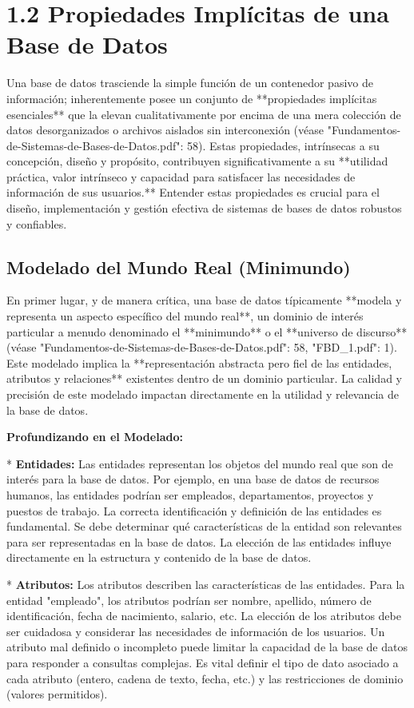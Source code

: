 \section{1.2 Propiedades Implícitas de una Base de Datos}

Una base de datos trasciende la simple función de un contenedor pasivo de información; inherentemente posee un conjunto de **propiedades implícitas esenciales** que la elevan cualitativamente por encima de una mera colección de datos desorganizados o archivos aislados sin interconexión (véase "Fundamentos-de-Sistemas-de-Bases-de-Datos.pdf": 58). Estas propiedades, intrínsecas a su concepción, diseño y propósito, contribuyen significativamente a su **utilidad práctica, valor intrínseco y capacidad para satisfacer las necesidades de información de sus usuarios.** Entender estas propiedades es crucial para el diseño, implementación y gestión efectiva de sistemas de bases de datos robustos y confiables.

\subsection{Modelado del Mundo Real (Minimundo)}

En primer lugar, y de manera crítica, una base de datos típicamente **modela y representa un aspecto específico del mundo real**, un dominio de interés particular a menudo denominado el **minimundo** o el **universo de discurso** (véase "Fundamentos-de-Sistemas-de-Bases-de-Datos.pdf": 58, "FBD\_1.pdf": 1).  Este modelado implica la **representación abstracta pero fiel de las entidades, atributos y relaciones** existentes dentro de un dominio particular.  La calidad y precisión de este modelado impactan directamente en la utilidad y relevancia de la base de datos.

\textbf{Profundizando en el Modelado:}

*   \textbf{Entidades:}  Las entidades representan los objetos del mundo real que son de interés para la base de datos.  Por ejemplo, en una base de datos de recursos humanos, las entidades podrían ser empleados, departamentos, proyectos y puestos de trabajo. La correcta identificación y definición de las entidades es fundamental. Se debe determinar qué características de la entidad son relevantes para ser representadas en la base de datos.  La elección de las entidades influye directamente en la estructura y contenido de la base de datos.

*   \textbf{Atributos:} Los atributos describen las características de las entidades. Para la entidad "empleado", los atributos podrían ser nombre, apellido, número de identificación, fecha de nacimiento, salario, etc. La elección de los atributos debe ser cuidadosa y considerar las necesidades de información de los usuarios.  Un atributo mal definido o incompleto puede limitar la capacidad de la base de datos para responder a consultas complejas.  Es vital definir el tipo de dato asociado a cada atributo (entero, cadena de texto, fecha, etc.) y las restricciones de dominio (valores permitidos).

